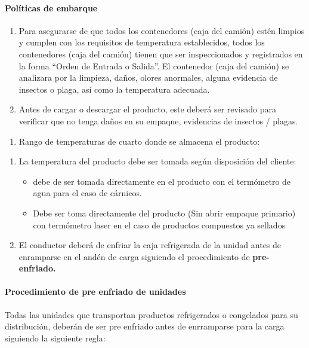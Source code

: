 \paragraph{Políticas de embarque}

\begin{enumerate}
	\item Para asegurarse de que todos los contenedores (caja del camión) estén limpios y cumplen con los requisitos de temperatura establecidos, todos los contenedores (caja del camión) tienen que ser inspeccionados y registrados en la forma “Orden de Entrada o Salida”. El contenedor (caja del camión) se analizara por la limpieza, daños, olores anormales, alguna evidencia de insectos o plaga, así como la temperatura adecuada.
	\item Antes de cargar o descargar el producto, este deberá ser revisado para verificar que no tenga daños en su empaque, evidencias de insectos / plagas.
\end{enumerate}


\begin{enumerate}
	\item Rango de temperaturas de cuarto donde se almacena el producto:
\end{enumerate}


\begin{enumerate}
	\item La temperatura del producto debe ser tomada según disposición del cliente:
	\begin{itemize}
		\item debe de ser tomada directamente en el producto con el termómetro de agua para el caso de cárnicos.
		\item Debe ser toma directamente del producto (Sin abrir empaque primario) con termómetro laser en el caso de productos compuestos ya sellados
	\end{itemize}
	\item El conductor deberá de enfriar la caja refrigerada de la unidad antes de enramparse en el andén de carga siguiendo el procedimiento de \textbf{pre-enfriado.}
\end{enumerate}




\paragraph{Procedimiento de pre enfriado de unidades}

Todas las unidades que transportan productos refrigerados o congelados para su distribución, deberán de ser pre enfriado antes de enrramparse para la carga siguiendo la siguiente regla:

